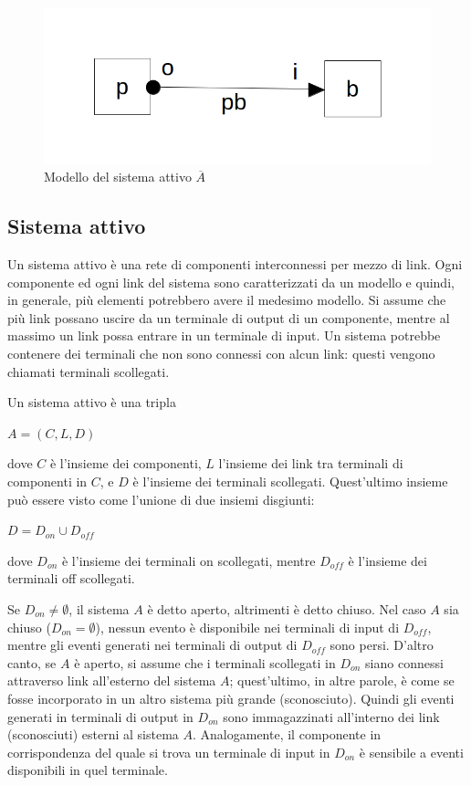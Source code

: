 \begin{figure}[htbp]
\centering
\includegraphics[scale=0.4]{./Img/sa/link.png}
\caption{Modello del sistema attivo $\overline{A}$}
\label{fig:model_link}
\end{figure}

\subsection{Sistema attivo}
Un sistema attivo è una rete di componenti interconnessi per mezzo di link. Ogni componente ed ogni link del sistema sono caratterizzati da un modello e quindi, in generale, più elementi potrebbero avere il medesimo modello. Si assume che più link possano uscire da un terminale di output di un componente, mentre al massimo un link possa entrare in un terminale di input.
Un sistema potrebbe contenere dei terminali che non sono connessi con alcun link: questi vengono chiamati terminali scollegati.

\begin{defn}
Un sistema attivo è una tripla
\begin{center}
	$ A = (C,L,D)$
\end{center}
dove $C$ è l'insieme dei componenti, $L$ l'insieme dei link tra terminali di componenti in $C$, e $D$ è l'insieme dei terminali scollegati. Quest'ultimo insieme può essere visto come l'unione di due insiemi disgiunti:
\begin{center}
	$ D = D_{on} \cup D_{off}$
\end{center}
dove $D_{on}$ è l'insieme dei terminali on scollegati, mentre $D_{off}$ è l'insieme dei terminali off scollegati. 
\end{defn}
Se $D_{on} \neq \emptyset $, il sistema $A$ è detto aperto, altrimenti è detto chiuso. Nel caso $A$ sia chiuso ($D_{on} = \emptyset$), nessun evento è disponibile nei terminali di input di $D_{off}$, mentre gli eventi generati nei terminali di output di $D_{off}$ sono persi.
D'altro canto, se $A$ è aperto, si assume che i terminali scollegati in $D_{on}$ siano connessi attraverso link all'esterno del sistema $A$; quest'ultimo, in altre parole, è come se fosse incorporato in un altro sistema più grande (sconosciuto). Quindi gli eventi generati in terminali di output in $D_{on}$ sono immagazzinati all'interno dei link (sconosciuti) esterni al sistema $A$. Analogamente, il componente in corrispondenza del quale si trova un terminale di input in $D_{on}$ è sensibile a eventi disponibili in quel terminale.

